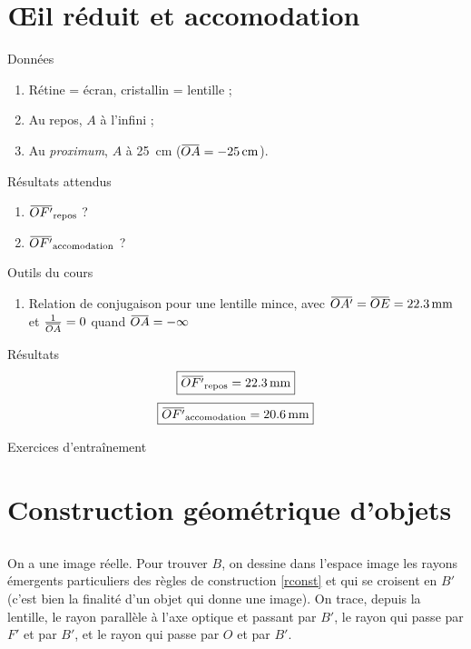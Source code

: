 \documentclass[10pt,a5paper,notitlepage]{book}
\begin{document}
\section{Œil réduit et accomodation}
\begin{NCdefi}{Données}
    \begin{enumerate}
        \item Rétine = écran, cristallin = lentille ;
        \item Au repos, $A$ à l'infini ;
        \item Au \textit{proximum}, $A$ à \SI{25}{cm} ($\OA = \SI{-25}{cm}$).
    \end{enumerate}
\end{NCdefi}

\begin{NCprop}{Résultats attendus}
    \begin{enumerate}
        \item $\OF \St{repos}$ ?
        \item $\OF \St{accomodation}$ ?
    \end{enumerate}
\end{NCprop}

\begin{NCdemo}{Outils du cours}
   \begin{enumerate}
       \item Relation de conjugaison pour une lentille mince, avec $\OAp =
           \obar{OE} = \SI{22.3}{mm} $ et $\frac{1}{\OA} = 0$ quand $\OA =
           -\infty$
   \end{enumerate} 
\end{NCdemo}

\begin{NCexem}{Résultats}
    \[ \boxed{\OF\St{repos} = \SI{22.3}{mm}}\]
    \[ \boxed{\OF\St{accomodation} = \SI{20.6}{mm}} \]
\end{NCexem}

\begin{center}
    \Huge Exercices d'entraînement
\end{center}

\section{Construction géométrique d'objets}
\subsection{}
On a une image réelle. Pour trouver $B$, on dessine dans l'espace image les
rayons émergents particuliers des règles de construction \ref{rconst} et qui se
croisent en $B'$ (c'est bien la finalité d'un objet qui donne une image). On
trace, depuis la lentille, le rayon parallèle à l'axe optique et passant par
$B'$, le rayon qui passe par $F'$ et par $B'$, et le rayon qui passe par $O$ et
par $B'$. \bigbreak
\end{document}
